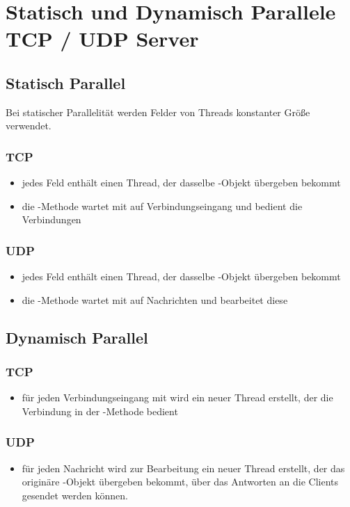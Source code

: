 \section{Statisch und Dynamisch Parallele TCP / UDP Server}

\subsection{Statisch Parallel}

Bei statischer Parallelität werden Felder von Threads konstanter Größe verwendet.
\subsubsection{TCP}

\begin{itemize}
    \item jedes Feld enthält einen Thread, der dasselbe -Objekt übergeben bekommt
    \item die -Methode wartet mit  auf Verbindungseingang und bedient die Verbindungen
\end{itemize}


\subsubsection{UDP}

\begin{itemize}
    \item jedes Feld enthält einen Thread, der dasselbe -Objekt übergeben bekommt
    \item die -Methode wartet mit  auf Nachrichten und bearbeitet diese
\end{itemize}

\subsection{Dynamisch Parallel}


\subsubsection{TCP}

\begin{itemize}
    \item für jeden Verbindungseingang mit  wird ein neuer Thread erstellt, der die Verbindung in der -Methode
    bedient
\end{itemize}


\subsubsection{UDP}

\begin{itemize}
    \item für jeden Nachricht wird zur Bearbeitung ein neuer Thread erstellt, der das originäre -Objekt übergeben bekommt,
    über das Antworten an die Clients gesendet werden können.
\end{itemize}
